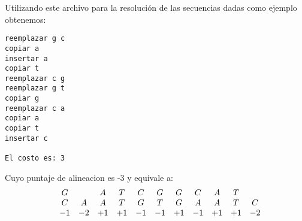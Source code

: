 \documentclass[12pt]{article}
\begin{document}
Utilizando este archivo para la resolución de las secuencias dadas como
ejemplo obtenemos:
\begin{lstlisting}
reemplazar g c
copiar a
insertar a
copiar t
reemplazar c g
reemplazar g t
copiar g
reemplazar c a
copiar a
copiar t
insertar c

El costo es: 3
\end{lstlisting}
Cuyo puntaje de alineacion es -3 y equivale a:
\[
\begin{array}{ccccccccccccc}
  &G &\space &A &T &C &G &G &C &A &T &\space  \\
  &C &A &A &T &G &T &G &A &A &T &C	\\
  &-1 &-2 &+1 &+1 &-1 &-1 &+1 &-1 &+1 &+1 &-2
\end{array}
\]

\newpage

\end{document}
